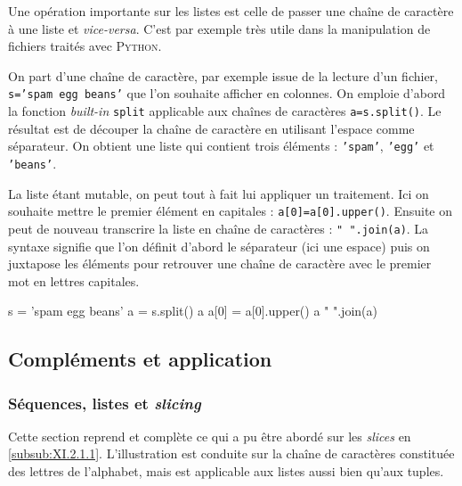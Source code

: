 Une opération importante sur les listes est celle de passer une chaî\-ne de caractère à une liste et \textit{vice-versa}. C'est par exemple très utile dans la manipulation de fichiers traités avec \textsc{Python}.

On part d'une chaîne de caractère, par exemple issue de la lecture d'un fichier, \texttt{s='spam egg beans'} que l'on souhaite afficher en colonnes. On emploie d'abord la fonction \textit{built-in} \texttt{split} applicable aux chaînes de caractères \texttt{a=s.split()}. Le résultat est de découper la chaîne de caractère en utilisant l'espace comme séparateur. On obtient une liste qui contient trois éléments : \texttt{'spam'}, \texttt{'egg'} et \texttt{'beans'}.

La liste étant mutable, on peut tout à fait lui appliquer un traitement. Ici on souhaite mettre le premier élément en capitales : \texttt{a[0]=a[0].upper()}. Ensuite on peut de nouveau transcrire la liste en chaîne de caractères : \texttt{" ".join(a)}. La syntaxe signifie que l'on définit d'abord le séparateur (ici une espace) puis on juxtapose les éléments pour retrouver une chaîne de caractère avec le premier mot en lettres capitales.

\vspace{2pt}

\begin{idleconsole}
\begin{pyconsole}
s = 'spam egg beans'
a = s.split()
a
a[0] = a[0].upper()
a
" ".join(a)
\end{pyconsole}
\end{idleconsole}


\subsection[Compléments et application]{Compléments et application}
\label{sub:XI.2.2}


\subsubsection[Séquences, listes et \textit{slicing}]{Séquences, listes et \textit{slicing}}
\label{subsub:XI.2.2.1}

Cette section reprend et complète ce qui a pu être abordé sur les \textit{slices} en \cref{subsub:XI.2.1.1}. L'illustration est conduite sur la chaîne de caractères constituée des lettres de l'alphabet, mais est applicable aux listes aussi bien qu'aux tuples.

